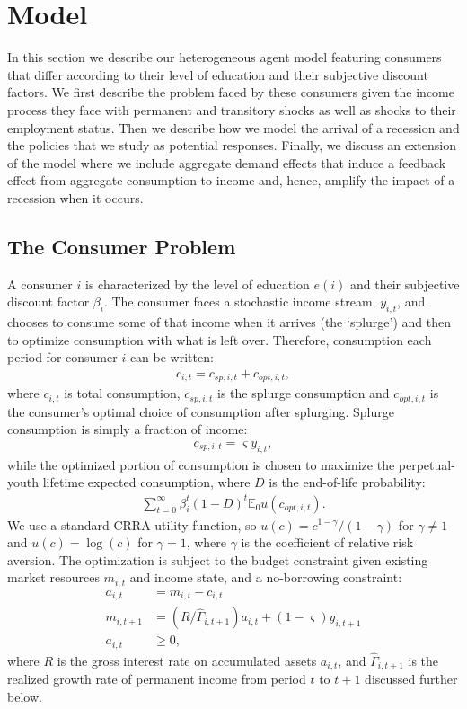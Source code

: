 \documentclass[../HAFiscal]{subfiles}
\begin{document}
	
\section{Model}
\label{sec:model}

In this section we describe our heterogeneous agent model featuring consumers that differ according to their level of education and their subjective discount factors. We first describe the problem faced by these consumers given the income process they face with permanent and transitory shocks as well as shocks to their employment status. Then we describe how we model the arrival of a recession and the policies that we study as potential responses. Finally, we discuss an extension of the model where we include aggregate demand effects that induce a feedback effect from aggregate consumption to income and, hence, amplify the impact of a recession when it occurs. 

\subsection{The Consumer Problem}
A consumer $i$ is characterized by the level of education $e(i)$ and their subjective discount factor $\beta_i$. The consumer faces a stochastic income stream, $y_{i,t}$, and chooses to consume some of that income when it arrives (the `splurge') and then to optimize consumption with what is left over. Therefore, consumption each period for consumer $i$ can be written:
\begin{align}
	c_{i,t} = c_{sp,i,t} + c_{opt,i,t},
\end{align}
where $c_{i,t}$ is total consumption, $c_{sp,i,t}$ is the splurge consumption and $c_{opt,i,t}$ is the consumer's optimal choice of consumption after splurging. Splurge consumption is simply a fraction of income:
\begin{align}
c_{sp,i,t} = \varsigma y_{i,t},
\end{align}
while the optimized portion of consumption is chosen to maximize the perpetual-youth lifetime expected consumption, where $D$ is the end-of-life probability:
\begin{align}
\sum_{t=0}^{\infty}\beta_i^t (1-D)^t \mathbb{E}_0 u(c_{opt,i,t}).
\end{align}
We use a standard CRRA utility function, so $u(c) = c^{1-\gamma}/(1-\gamma)$ for $\gamma \neq 1$ and $u(c) = \log(c)$ for $\gamma=1$, where $\gamma$ is the coefficient of relative risk aversion. The optimization is subject to the budget constraint given existing market resources $m_{i,t}$ and income state, and a no-borrowing constraint: 
\begin{align}
	a_{i,t} &= m_{i,t} - c_{i,t} \\ 
	m_{i,t+1} &= (R/\hat{\Gamma}_{i,t+1}) a_{i,t} + (1-\varsigma) y_{i,t+1} \\
	a_{i,t} &\geq 0,  
\end{align}
where $R$ is the gross interest rate on accumulated assets $a_{i,t}$, and $\hat{\Gamma}_{i,t+1}$ is the realized growth rate of permanent income from period $t$ to $t+1$ discussed further below.
\end{document}
